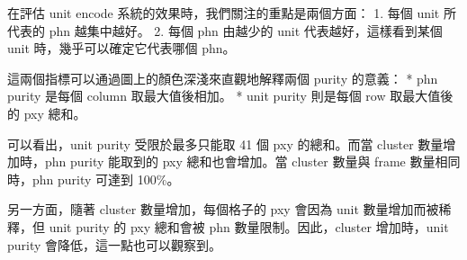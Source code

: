 在評估 unit encode 系統的效果時，我們關注的重點是兩個方面：
1. 每個 unit 所代表的 phn 越集中越好。
2. 每個 phn 由越少的 unit 代表越好，這樣看到某個 unit 時，幾乎可以確定它代表哪個 phn。

這兩個指標可以通過圖上的顏色深淺來直觀地解釋兩個 purity 的意義：
* phn purity 是每個 column 取最大值後相加。
* unit purity 則是每個 row 取最大值後的 pxy 總和。

可以看出，unit purity 受限於最多只能取 41 個 pxy 的總和。而當 cluster 數量增加時，phn purity 能取到的 pxy 總和也會增加。當 cluster 數量與 frame 數量相同時，phn purity 可達到 100\%。

另一方面，隨著 cluster 數量增加，每個格子的 pxy 會因為 unit 數量增加而被稀釋，但 unit purity 的 pxy 總和會被 phn 數量限制。因此，cluster 增加時，unit purity 會降低，這一點也可以觀察到。
